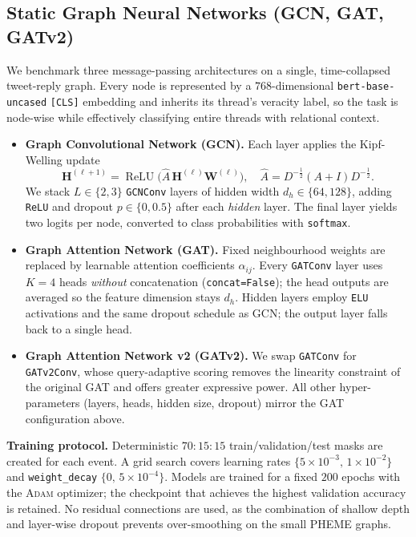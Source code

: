 \documentclass{cshonours}
\begin{document}
\subsection{Static Graph Neural Networks (GCN, GAT, GATv2)}
\label{subsec:static_gnns}

We benchmark three message-passing architectures on a single, time-collapsed tweet-reply graph.  
Every node is represented by a $768$-dimensional \texttt{bert-base-uncased} \texttt{[CLS]} embedding and inherits its thread's veracity label, so the task is node-wise while effectively classifying entire threads with relational context.

\begin{itemize}
\item \textbf{Graph Convolutional Network (GCN).}  
  Each layer applies the Kipf-Welling update
  \[
    \mathbf{H}^{(\ell+1)}
    = \operatorname{ReLU}\!\bigl(\hat{A}\,\mathbf{H}^{(\ell)}\mathbf{W}^{(\ell)}\bigr),
    \quad
    \hat{A}=D^{-\tfrac12}(A+I)D^{-\tfrac12}.
  \]
  We stack $L\!\in\!\{2,3\}$ \texttt{GCNConv} layers of hidden width
  $d_h\!\in\!\{64,128\}$, adding \texttt{ReLU} and dropout
  $p\!\in\!\{0,0.5\}$ after each \emph{hidden} layer.  
  The final layer yields two logits per node, converted to class
  probabilities with \texttt{softmax}.

\item \textbf{Graph Attention Network (GAT).}  
  Fixed neighbourhood weights are replaced by learnable attention
  coefficients $\alpha_{ij}$.  
  Every \texttt{GATConv} layer uses $K=4$ heads \emph{without}
  concatenation (\texttt{concat=False}); the head outputs are averaged so
  the feature dimension stays $d_h$.  
  Hidden layers employ \texttt{ELU} activations and the same dropout
  schedule as GCN; the output layer falls back to a single head.

\item \textbf{Graph Attention Network v2 (GATv2).}  
  We swap \texttt{GATConv} for \texttt{GATv2Conv}, whose
  query-adaptive scoring removes the linearity constraint of the original
  GAT and offers greater expressive power.  
  All other hyper-parameters (layers, heads, hidden size, dropout) mirror
  the GAT configuration above.
\end{itemize}

\textbf{Training protocol.}  Deterministic $70{:}15{:}15$
train/validation/test masks are created for each event.  
A grid search covers learning rates
$\{5\times10^{-3},\,1\times10^{-2}\}$ and
\texttt{weight\_decay} $\{0,\,5\times10^{-4}\}$.  
Models are trained for a fixed $200$ epochs with the \textsc{Adam}
optimizer; the checkpoint that achieves the highest validation accuracy is
retained.  No residual connections are used, as the combination of shallow
depth and layer-wise dropout prevents over-smoothing on the small PHEME
graphs.
\end{document}
